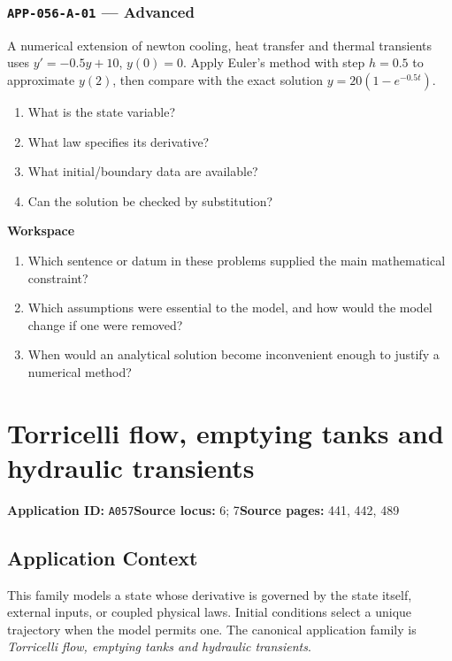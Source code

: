 \documentclass[11pt]{book}
\newcommand{\pid}[1]{\texttt{#1}}
\newcommand{\workspace}{\par\vspace{0.7in}\hrulefill\par\vspace{0.55in}\hrulefill\par}
\begin{document}
\subsection*{\pid{APP-056-A-01} — Advanced}
\begin{problembox}
A numerical extension of newton cooling, heat transfer and thermal transients uses $y'=-0.5y+10$, $y(0)=0$. Apply Euler's method with step $h=0.5$ to approximate $y(2)$, then compare with the exact solution $y=20(1-e^{-0.5t})$.
\end{problembox}
\begin{promptbox}\begin{enumerate}
\item What is the state variable?
\item What law specifies its derivative?
\item What initial/boundary data are available?
\item Can the solution be checked by substitution?
\end{enumerate}\end{promptbox}
\textbf{Workspace}\workspace
\begin{reflectionbox}\begin{enumerate}
\item Which sentence or datum in these problems supplied the main mathematical constraint?
\item Which assumptions were essential to the model, and how would the model change if one were removed?
\item When would an analytical solution become inconvenient enough to justify a numerical method?
\end{enumerate}\end{reflectionbox}
\chapter{Torricelli flow, emptying tanks and hydraulic transients}\label{app:A057}
\textbf{Application ID:} \pid{A057}\quad \textbf{Source locus:} 6; 7\quad \textbf{Source pages:} 441, 442, 489
\section*{Application Context}
This family models a state whose derivative is governed by the state itself, external inputs, or coupled physical laws. Initial conditions select a unique trajectory when the model permits one. The canonical application family is \emph{Torricelli flow, emptying tanks and hydraulic transients}.
\end{document}
